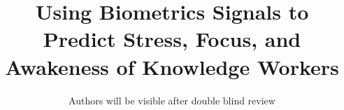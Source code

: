 \documentclass[sigchi, review]{acmart}
\begin{document}
\title{Using Biometrics Signals to Predict Stress, Focus, and Awakeness of Knowledge Workers}


\author{Authors will be visible after double blind review\vspace{0cm}}%


\begin{comment}

\author{Mauricio Soto}
\affiliation{%
  \institution{Carnegie Mellon University}
  \city{Pittsburgh}
  \state{PA}
}
\email{mauriciosoto@cmu.edu}

\author{Chris Satterfield}
\affiliation{%
  \institution{The University of British Columbia}
  \city{Vancouver}
  \state{British Columbia}
}
\email{cds00@cs.ubc.ca}

\author{Thomas Fritz}
\affiliation{%
  \institution{University of Zurich}
  \city{Zurich}
  \state{Switzerland}
}
\email{fritz@ifi.uzh.ch}

\author{Gail C. Murphy}
\affiliation{%
  \institution{The University of British olumbia}
  \city{Vancouver}
  \state{British Columbia}
}
\email{murphy@cs.ubc.ca}

\author{David Shepherd}
\affiliation{%
  \institution{ABB Corporate Research}
  \city{Raleigh}
  \state{North Carolina}
}
\email{david.shepherd@us.abb.com}

\author{Nicholas Kraft}
\affiliation{%
  \institution{ABB Corporate Research}
  \city{Raleigh}
  \state{North Carolina}
}
\email{nicholas.a.kraft@us.abb.com}

\end{comment}

\renewcommand{\shortauthors}{(Authors)}
\end{document}

